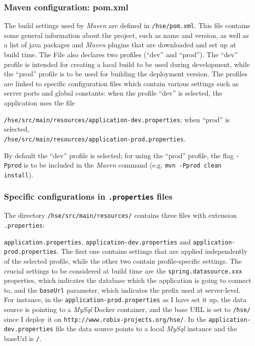 \documentclass[a4paper]{usiinfbachelorproject}
\begin{document}
\begin{appendices}
        \subsubsection{Maven configuration: pom.xml}

        The build settings used by \emph{Maven} are defined in \texttt{/hse/pom.xml}. This file contains some general information
        about the project, such as name and version, as well as a list of java packages and \emph{Maven} plugins that are 
        downloaded and set up at build time. The File also declares two profiles (``dev'' and ``prod''). The ``dev'' profile 
        is intended for creating a local build to be used during development, while the ``prod'' profile is to be used for building the deployment version.
        The profiles are linked to specific configuration files which contain various settings such as server ports and global
        constants: when the profile ``dev'' is selected, the application uses the file 

\texttt{/hse/src/main/resources/application-dev.properties};
        when ``prod'' is selected, \\ \texttt{/hse/src/main/resources/application-prod.properties}. 

        By default the ``dev'' profile is selected;
        for using the ``prod'' profile, the flag \texttt{-Pprod} is to be included in the \emph{Maven} command 
        (e.g. \texttt{mvn -Pprod clean install}).

        \subsubsection{Specific configurations in \texttt{.properties} files}

        The directory \texttt{/hse/src/main/resources/} contains three files with extension \texttt{.properties}:

        \texttt{application.properties}, \texttt{application-dev.properties} and \texttt{application-prod.properties}.
        The first one contains settings that are applied independently of the selected profile, while the other
        two contain profile-specific settings. The crucial settings to be considered at build time are the 
        \texttt{spring.datasource.xxx} properties, which indicates the database which the application is going to connect to, and 
        the \texttt{baseUrl} parameter, which indicates the prefix used at server-level.
        For instance, in the \texttt{application-prod.properties} as I have set it up, the data source is pointing to a \emph{MySql} Docker container,
        and the base URL is set to \texttt{/hse/} since I deploy it on \texttt{http://www.robix-projects.org/hse/}. 
        In the \texttt{application-dev.properties} file the data source points to a local \emph{MySql} instance and the baseUrl is \texttt{/}.


\end{appendices}
\end{document}
